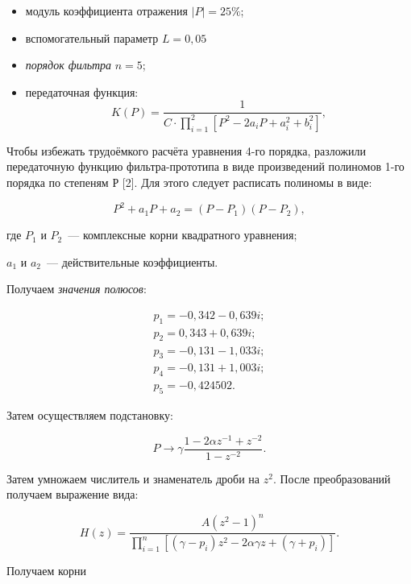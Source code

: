 \begin{itemize}
\item модуль коэффициента отражения $|P| = 25\%$;
\item вспомогательный параметр $L = 0{,}05$
\item \textit{порядок фильтра} $n = 5$;
\item передаточная функция:
  \begin{equation*}
    K(P) = \frac{1}{C \cdot \prod_{i =1}^2 \left[P^2 - 2a_iP + a_i^2
        + b_i^2\right]},
  \end{equation*}
\end{itemize}

\point Чтобы избежать трудоёмкого расчёта уравнения 4-го порядка,
разложили передаточную функцию фильтра-прототипа в виде произведений
полиномов 1-го порядка по степеням Р [2]. Для этого следует расписать
полиномы в виде:

\begin{equation*}
  P^2 + a_1P + a_2 = (P-P_1)(P-P_2),
\end{equation*}
\begin{ESKDexplanation}
\item[где ] $P_1$ и $P_2$~--- комплексные корни квадратного уравнения;
\item $a_1$ и $a_2$~--- действительные коэффициенты.
\end{ESKDexplanation}

Получаем \textit{значения полюсов}:

\begin{gather*}
  p_1 = -0{,}342 - 0{,}639i;\\
  p_2 =  0{,}343 + 0{,}639i;\\
  p_3 = -0{,}131 - 1{,}033i;\\
  p_4 = -0{,}131 + 1{,}003i;\\
  p_5 = -0{,}424502.
\end{gather*}

\point Затем осуществляем подстановку:

\begin{equation*}
  P  \rightarrow \gamma \frac{1 - 2 \alpha z^{-1}+z^{-2}}{1-z^{-2}}.
\end{equation*}

Затем умножаем числитель и знаменатель дроби на $z^2$. После
преобразований получаем выражение вида:

\begin{equation*}
  H(z) = \frac{A(z^2 - 1)^n}{\displaystyle \prod_{i=1}^n\left[(\gamma - p_i)z^2 -
      2\alpha \gamma z + (\gamma + p_i)\right]}.
\end{equation*}

Получаем корни

